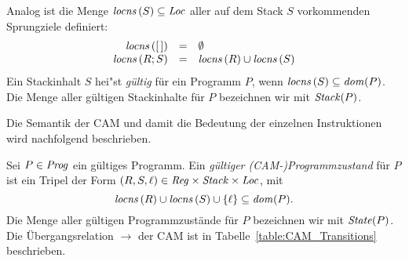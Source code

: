 \documentclass[12pt,fleqn]{article}
\begin{document}
\begin{definition}
  Analog ist die Menge ${\text{\it locns\/}}\,(S) \subseteq {\text{\it Loc\/}}$ aller auf dem Stack $S$ vorkommenden Sprungziele definiert:
  \[\begin{array}{rcl}
    {\text{\it locns\/}}\,([\,]) &=& \emptyset \\
    {\text{\it locns\/}}\,(R;S) &=& {\text{\it locns\/}}\,(R) \cup {\text{\it locns\/}}\,(S)
  \end{array}\]
  Ein Stackinhalt $S$ hei"st {\em g\"ultig} f\"ur ein Programm $P$, wenn ${\text{\it locns\/}}\,(S)\subseteq{\text{\it dom\/}}(P)$. Die Menge
  aller g\"ultigen Stackinhalte f\"ur $P$ bezeichnen wir mit ${\text{\it Stack\/}}(P)$.
\end{definition}

Die Semantik der CAM und damit die Bedeutung der einzelnen Instruktionen wird nachfolgend beschrieben.

\begin{definition}
  Sei $P\in{\text{\it Prog\/}}$ ein g\"ultiges Programm. Ein {\em g\"ultiger (CAM-)Programmzustand} f\"ur $P$ ist ein Tripel der Form
  $(R,S,\ell) \in {\text{\it Reg\/}} \times {\text{\it Stack\/}} \times {\text{\it Loc\/}}$, mit
  \[
  {\text{\it locns\/}}\,(R)\cup{\text{\it locns\/}}\,(S)\cup\{\ell\}\subseteq{\text{\it dom\/}}(P).
  \]
  Die Menge aller g\"ultigen Programmzust\"ande f\"ur $P$ bezeichnen wir mit ${\text{\it State\/}}(P)$.
  Die \"Ubergangsrelation $\to$ der CAM ist in Tabelle~\ref{table:CAM_Transitions} beschrieben.
\end{definition}
\end{document}
